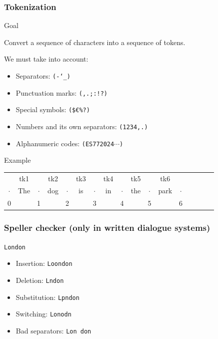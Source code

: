 \documentclass[11pt]{beamer}
\begin{document}
\begin{frame}[fragile]
	\frametitle{Tokenization}
	\begin{block}{Goal}
		\begin{center}
			Convert a sequence of characters into a sequence of tokens.
		\end{center}
	\end{block}
	\pause
	We must take into account:
	\begin{itemize}
		\item Separators: \texttt{(\textvisiblespace -\char`_)}
		\item Punctuation marks: \texttt{(,.;:!?)}
		\item Special symbols: \texttt{(\$\euro\%?)}
		\item Numbers and its own separators: \texttt{(1234,.)}
		\item Alphanumeric codes: \texttt{(ES772024$\cdots$)}
	\end{itemize}
	\pause
	\begin{block}{Example}
	\begin{center}
		\begin{tabular}{ c c c c c c c c c c c c c c c c c }
			& tk1 & & tk2 & & tk3 & & tk4 & & tk5 & & tk6 \\
			$\cdot$ & The & $\cdot$ & dog & $\cdot$ & is & $\cdot$ & in & $\cdot$ & the & $\cdot$ & park & $\cdot$\\
			0 & & 1 & & 2 & & 3 & & 4 & & 5 & & 6
		\end{tabular}
	\end{center}
	\end{block}
\end{frame}

\begin{frame}
\frametitle{Speller checker (only in written dialogue systems)}
\begin{center}
	\Huge \texttt{London}
\end{center}
\begin{itemize}
	\item Insertion: \texttt{Loondon} 
	\item Deletion: \texttt{Lndon} 
	\item Substitution: \texttt{Lpndon} 
	\item Switching: \texttt{Lonodn} 
	\item Bad separators: \texttt{Lon don} 
\end{itemize}
\end{frame}
\end{document}
